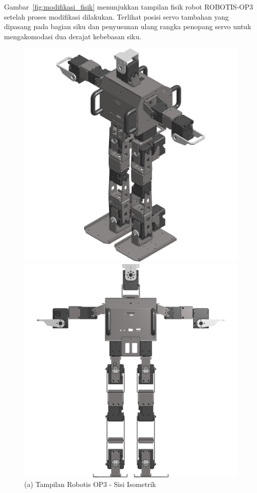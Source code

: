 Gambar~\ref{fig:modifikasi_fisik} menunjukkan tampilan fisik robot ROBOTIS-OP3 setelah proses modifikasi dilakukan. Terlihat posisi servo tambahan yang dipasang pada bagian siku dan penyusunan ulang rangka penopang servo untuk mengakomodasi dua derajat kebebasan siku.

\begin{figure}[H]
    \centering
    \begin{minipage}{0.48\textwidth}
        \centering
        \includegraphics[width=\linewidth]{images/mod_robot1.png}
        \caption*{(a) Tampilan Robotis OP3 - Sisi Isometrik}
    \end{minipage}
    \hfill
    \begin{minipage}{0.48\textwidth}
        \centering
        \includegraphics[width=\linewidth]{images/mod_robot2.png}

\end{minipage}
\end{figure}

